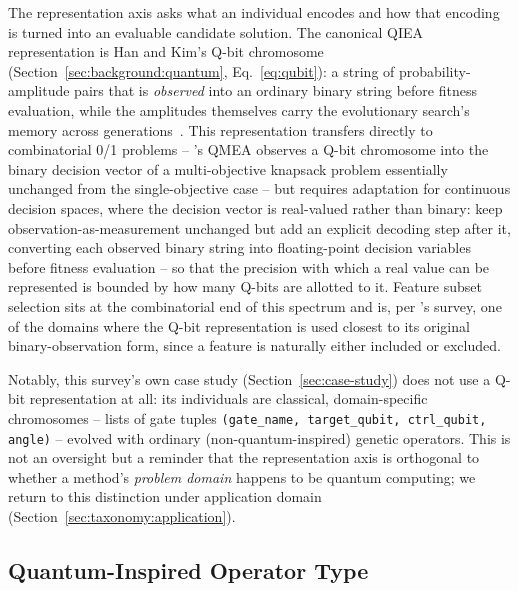 The representation axis asks what an individual encodes and how that
encoding is turned into an evaluable candidate solution. The canonical
QIEA representation is Han and Kim's Q-bit chromosome
(Section~\ref{sec:background:quantum}, Eq.~\ref{eq:qubit}): a string of
probability-amplitude pairs that is \emph{observed} into an ordinary
binary string before fitness evaluation, while the amplitudes themselves
carry the evolutionary search's memory across
generations~\citep{han2002qea}. This representation transfers directly
to combinatorial 0/1 problems -- \citet{kim2006qmea}'s QMEA observes a
Q-bit chromosome into the binary decision vector of a multi-objective
knapsack problem essentially unchanged from the single-objective case --
but requires adaptation for continuous decision spaces, where the
decision vector is real-valued rather than binary:
\citet{olvera2023continuous} keep observation-as-measurement unchanged
but add an explicit decoding step after it, converting each observed
binary string into floating-point decision variables before fitness
evaluation -- so that the precision with which a real value can be
represented is bounded by how many Q-bits are allotted to it. Feature subset selection sits at the
combinatorial end of this spectrum and is, per
\citet{vivek2025fss}'s survey, one of the domains where the Q-bit
representation is used closest to its original binary-observation form,
since a feature is naturally either included or excluded.

Notably, this survey's own case study (Section~\ref{sec:case-study}) does
not use a Q-bit representation at all: its individuals are classical,
domain-specific chromosomes -- lists of gate tuples
\texttt{(gate\_name, target\_qubit, ctrl\_qubit, angle)} -- evolved with
ordinary (non-quantum-inspired) genetic operators. This is not an
oversight but a reminder that the representation axis is orthogonal to
whether a method's \emph{problem domain} happens to be quantum computing;
we return to this distinction under application domain
(Section~\ref{sec:taxonomy:application}).

\subsection{Quantum-Inspired Operator Type}
\label{sec:taxonomy:operator}

